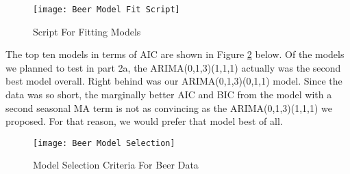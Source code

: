 \documentclass[12pt, letterpaper]{article}
\theoremstyle{definition}
\numberwithin{equation}{section}
\newcommand{\+}[1]{+_{\scalebox{.375}{#1}}}
\newcommand{\1}{\mathbbm{1}}
\begin{document}
\begin{figure}[H]
	\centering
	\texttt{[image: Beer Model Fit Script]}
	\caption{Script For Fitting Models}
	\label{Beer Model Fit Script}
\end{figure}

The top ten models in terms of AIC are shown in Figure \ref{Beer Model Selection} below. Of the models we planned to test in part 2a, the ARIMA(0,1,3)(1,1,1) actually was the second best model overall. Right behind was our ARIMA(0,1,3)(0,1,1) model. Since the data was so short, the marginally better AIC and BIC from the model with a second seasonal MA term is not as convincing as the ARIMA(0,1,3)(1,1,1) we proposed. For that reason, we would prefer that model best of all. 

\begin{figure}[H]
	\centering
	\texttt{[image: Beer Model Selection]}
	\caption{Model Selection Criteria For Beer Data}
	\label{Beer Model Selection}
\end{figure}
\end{document}
